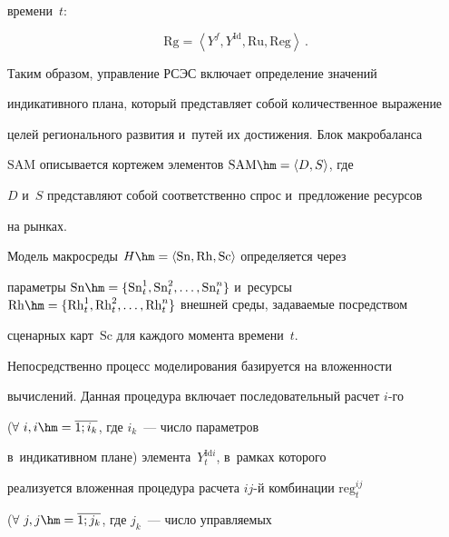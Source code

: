 времени~$t$:


  \begin{equation*}


  \mathrm{Rg}= \left\langle Y^f, Y^{\mathrm{Id}}, \mathrm{Ru}, \mathrm{Reg}\right\rangle\,.




  \end{equation*}


  


  Таким образом, управление РСЭС включает определение значений 


индикативного плана, который пред\-став\-ля\-ет собой количественное выражение 


целей регионального развития и~путей их до\-сти\-же\-ния. Блок мак\-ро\-ба\-лан\-са 


$\mathrm{SAM}$ описывается кортежем элементов $\mathrm{SAM}\hm= \langle D, S\rangle$, где 


$D$ и~$S$ пред\-став\-ля\-ют собой соответственно спрос и~предложение ресурсов 


на рынках.


  


  Модель макросреды $H\hm= \langle \mathrm{Sn}, \mathrm{Rh}, \mathrm{Sc}\rangle$ определяется через 


параметры $\mathrm{Sn}\hm= \{ \mathrm{Sn}_t^1, \mathrm{Sn}_t^2, \ldots , 


\mathrm{Sn}_t^n\}$ и~ресурсы $\mathrm{Rh}\hm= \{ 


\mathrm{Rh}_t^1, \mathrm{Rh}_t^2, \ldots , \mathrm{Rh}_t^n\}$ внешней среды, задаваемые по\-сред\-ст\-вом 


сценарных карт~$\mathrm{Sc}$ для каждого момента времени~$t$.


  


  Непосредственно процесс моделирования базируется на вложенности 


вы\-чис\-ле\-ний. Данная процедура включает последовательный рас\-чет $i$-го 


($\forall\ i, i\hm= \overline{1;i_k}$, где $i_k$~--- число па\-ра\-мет\-ров 


в~индикативном плане) элемента~$Y_t^{\mathrm{Id}i}$, в~рамках которого 


реализуется вложенная процедура рас\-че\-та $ij$-й комбинации $\mathrm{reg}_t^{ij}$ 


($\forall\ j, j\hm=\overline{1;j_k}$, где $j_k$~--- чис\-ло управ\-ля\-емых 


